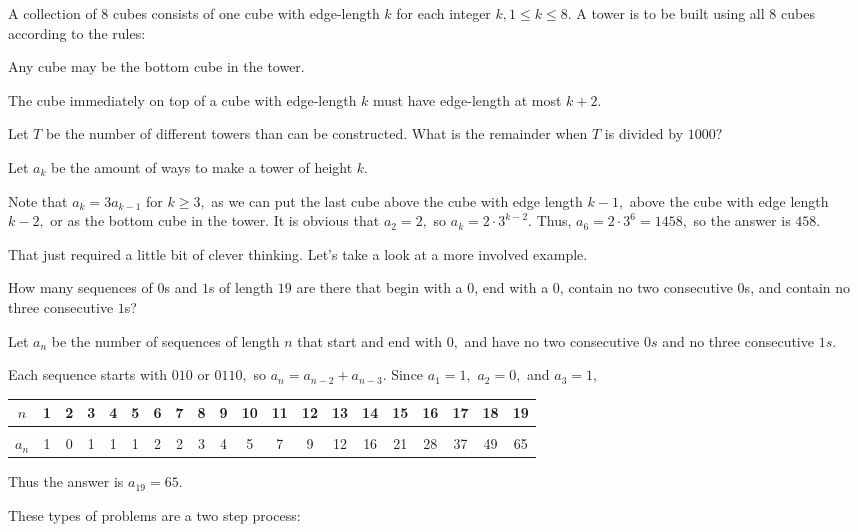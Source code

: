 \documentclass[blue,onecol]{shooting}
\begin{document}
\begin{exam}[AIME I 2006/11]
A collection of $8$ cubes consists of one cube with edge-length $k$ for each integer $k, 1 \le k \le 8.$ A tower is to be built using all $8$ cubes according to the rules:

\begin{itemize}

    \Item Any cube may be the bottom cube in the tower.

    \Item The cube immediately on top of a cube with edge-length $k$ must have edge-length at most $k+2.$

\end{itemize}

Let $T$ be the number of different towers than can be constructed. What is the remainder when $T$ is divided by $1000?$
\end{exam}
\begin{sol}
Let $a_k$ be the amount of ways to make a tower of height $k.$
    
Note that $a_k=3a_{k-1}$ for $k\geq 3,$ as we can put the last cube above the cube with edge length $k-1,$ above the cube with edge length $k-2,$ or as the bottom cube in the tower. It is obvious that $a_2=2,$ so $a_k=2\cdot 3^{k-2}.$ Thus, $a_6=2\cdot 3^6=1458,$ so the answer is $458.$
\end{sol}
That just required a little bit of clever thinking. Let's take a look at a more involved example.

\begin{exam}[AMC 12B 2019/23]
How many sequences of $0$s and $1$s of length $19$ are there that begin with a $0$, end with a $0$, contain no two consecutive $0$s, and contain no three consecutive $1$s?
\end{exam}
\begin{sol}
Let $a_n$ be the number of sequences of length $n$ that start and end with $0,$ and have no two consecutive $0s$ and no three consecutive $1s.$

Each sequence starts with $010$ or $0110,$ so $a_n=a_{n-2}+a_{n-3}.$ Since $a_1=1,$ $a_2=0,$ and $a_3=1,$

\begin{center}
\begin{tabular}{|c|c|c|c|c|c|c|c|c|c|c|c|c|c|c|c|c|c|c|c|}
\hline
$n$ & 1 & 2 & 3 & 4 & 5 & 6 & 7 & 8 & 9 & 10 & 11 & 12 & 13 & 14 & 15 & 16 & 17 & 18 & 19 \\
\hline & \\[-12pt]
$a_n$ & 1 & 0 & 1 & 1 & 1 & 2 & 2 & 3 & 4 & 5 & 7 & 9 & 12 & 16 & 21 & 28 & 37 & 49 & 65 \\
\hline
\end{tabular}
\end{center}

Thus the answer is $a_{19}=65.$
\end{sol}
These types of problems are a two step process:
\end{document}
